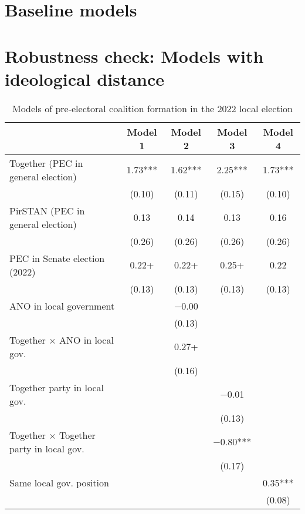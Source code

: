 \documentclass[fignum,12pt,titlepage]{article}
\begin{document}
\appendix

\section{Baseline models}
{}

\newpage

\section{Robustness check: Models with ideological distance}
\label{app:1}

\begin{longtable}[H]{lcccc}
\caption{Models of pre-electoral coalition formation in the 2022 local election}
    \label{tab:3} \\
\toprule
  & Model 1 & Model 2 & Model 3 & Model 4\\
\midrule
Together (PEC in general election) & \num{1.73}*** & \num{1.62}*** & \num{2.25}*** & \num{1.73}***\\
 & (\num{0.10}) & (\num{0.11}) & (\num{0.15}) & (\num{0.10})\\
PirSTAN (PEC in general election) & \num{0.13} & \num{0.14} & \num{0.13} & \num{0.16}\\
 & (\num{0.26}) & (\num{0.26}) & (\num{0.26}) & (\num{0.26})\\
PEC in Senate election (2022) & \num{0.22}+ & \num{0.22}+ & \num{0.25}+ & \num{0.22}\\
 & (\num{0.13}) & (\num{0.13}) & (\num{0.13}) & (\num{0.13})\\
ANO in local government &  & \num{-0.00} &  & \\
 &  & (\num{0.13}) &  & \\
Together × ANO in local gov. &  & \num{0.27}+ &  & \\
 &  & (\num{0.16}) &  & \\
Together party in local gov. &  &  & \num{-0.01} & \\
 &  &  & (\num{0.13}) & \\
Together × Together party in local gov. &  &  & \num{-0.80}*** & \\
 &  &  & (\num{0.17}) & \\
Same local gov. position &  &  &  & \num{0.35}***\\
 &  &  &  & (\num{0.08})\\

\end{longtable}
\end{document}
